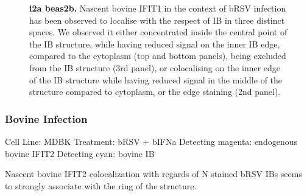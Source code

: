 \begin{figure}
\begin{subfigure}{1\textwidth}
    \end{subfigure}
    \caption[i2a beas2b]{\textbf{i2a beas2b.} Nascent bovine IFIT1 in the context of bRSV infection has been observed to localise with the respect of IB in three distinct spaces. We observed it either concentrated inside the central point of the IB structure, while having reduced signal on the inner IB edge, compared to the cytoplasm (top and bottom panels), being excluded from the IB structure (3rd panel), or colocalising on the inner edge of the IB structure while having reduced signal in the middle of the structure compared to cytoplasm, or the edge staining (2nd panel).}
    \label{fig:i2a beas2b}
\end{figure}

\subsubsection{Bovine Infection}
Cell Line: MDBK \newline
Treatment: bRSV + bIFNa \newline
Detecting magenta: endogenous bovine IFIT2  \newline
Detecting cyan: bovine IB \newline

Nascent bovine IFIT2 colocalization with regards of N stained bRSV IBs seems to strongly associate with the ring of the structure.

